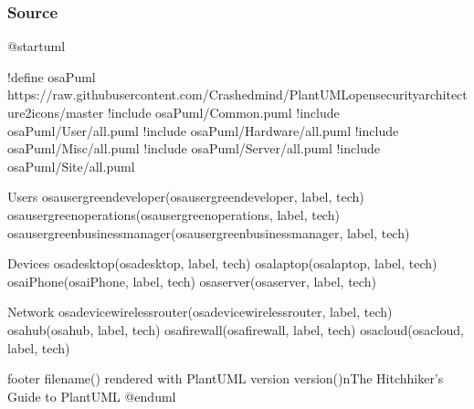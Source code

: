 \documentclass[letterpaper,10pt,english]{sphinxmanual}
\begin{document}
\subsubsection{Source}
\label{\detokenize{NetworkUsersMachines/NetworkUsersMachines:id4}}
\begin{sphinxVerbatim}[commandchars=\\\{\},numbers=left,firstnumber=1,stepnumber=1]
@startuml

!define osaPuml https://raw.githubusercontent.com/Crashedmind/PlantUML\PYGZhy{}opensecurityarchitecture2\PYGZhy{}icons/master
!include osaPuml/Common.puml
!include osaPuml/User/all.puml
!include osaPuml/Hardware/all.puml
!include osaPuml/Misc/all.puml
!include osaPuml/Server/all.puml
!include osaPuml/Site/all.puml


\PYGZsq{} Users
osa\PYGZus{}user\PYGZus{}green\PYGZus{}developer(osa\PYGZus{}user\PYGZus{}green\PYGZus{}developer, \PYGZdq{}label\PYGZdq{}, \PYGZdq{}tech\PYGZdq{})
osa\PYGZus{}user\PYGZus{}green\PYGZus{}operations(osa\PYGZus{}user\PYGZus{}green\PYGZus{}operations, \PYGZdq{}label\PYGZdq{}, \PYGZdq{}tech\PYGZdq{})
osa\PYGZus{}user\PYGZus{}green\PYGZus{}business\PYGZus{}manager(osa\PYGZus{}user\PYGZus{}green\PYGZus{}business\PYGZus{}manager, \PYGZdq{}label\PYGZdq{}, \PYGZdq{}tech\PYGZdq{})

\PYGZsq{} Devices
osa\PYGZus{}desktop(osa\PYGZus{}desktop, \PYGZdq{}label\PYGZdq{}, \PYGZdq{}tech\PYGZdq{})
osa\PYGZus{}laptop(osa\PYGZus{}laptop, \PYGZdq{}label\PYGZdq{}, \PYGZdq{}tech\PYGZdq{})
osa\PYGZus{}iPhone(osa\PYGZus{}iPhone, \PYGZdq{}label\PYGZdq{}, \PYGZdq{}tech\PYGZdq{})
osa\PYGZus{}server(osa\PYGZus{}server, \PYGZdq{}label\PYGZdq{}, \PYGZdq{}tech\PYGZdq{})

\PYGZsq{} Network
osa\PYGZus{}device\PYGZus{}wireless\PYGZus{}router(osa\PYGZus{}device\PYGZus{}wireless\PYGZus{}router, \PYGZdq{}label\PYGZdq{}, \PYGZdq{}tech\PYGZdq{})
osa\PYGZus{}hub(osa\PYGZus{}hub, \PYGZdq{}label\PYGZdq{}, \PYGZdq{}tech\PYGZdq{})
osa\PYGZus{}firewall(osa\PYGZus{}firewall, \PYGZdq{}label\PYGZdq{}, \PYGZdq{}tech\PYGZdq{})
osa\PYGZus{}cloud(osa\PYGZus{}cloud, \PYGZdq{}label\PYGZdq{}, \PYGZdq{}tech\PYGZdq{})

footer \PYGZpc{}filename() rendered with PlantUML version \PYGZpc{}version()\PYGZbs{}nThe Hitchhiker’s Guide to PlantUML
@enduml


\end{sphinxVerbatim}
\end{document}
